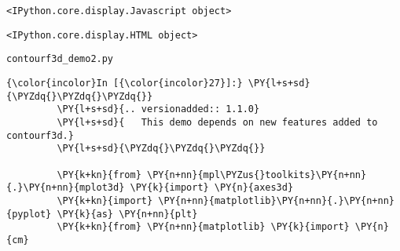     
    \begin{verbatim}
<IPython.core.display.Javascript object>
    \end{verbatim}

    
    
    \begin{verbatim}
<IPython.core.display.HTML object>
    \end{verbatim}

    
    \texttt{contourf3d\_demo2.py}

    \begin{Verbatim}[commandchars=\\\{\}]
{\color{incolor}In [{\color{incolor}27}]:} \PY{l+s+sd}{\PYZdq{}\PYZdq{}\PYZdq{}}
         \PY{l+s+sd}{.. versionadded:: 1.1.0}
         \PY{l+s+sd}{   This demo depends on new features added to contourf3d.}
         \PY{l+s+sd}{\PYZdq{}\PYZdq{}\PYZdq{}}
         
         \PY{k+kn}{from} \PY{n+nn}{mpl\PYZus{}toolkits}\PY{n+nn}{.}\PY{n+nn}{mplot3d} \PY{k}{import} \PY{n}{axes3d}
         \PY{k+kn}{import} \PY{n+nn}{matplotlib}\PY{n+nn}{.}\PY{n+nn}{pyplot} \PY{k}{as} \PY{n+nn}{plt}
         \PY{k+kn}{from} \PY{n+nn}{matplotlib} \PY{k}{import} \PY{n}{cm}
\end{Verbatim}


